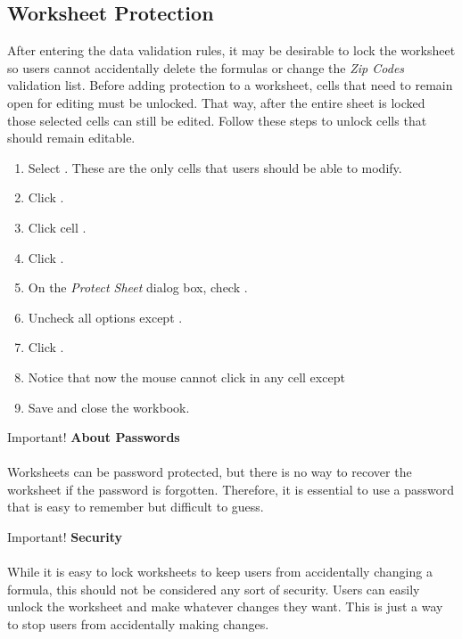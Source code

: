 \subsection{Worksheet Protection}

After entering the data validation rules, it may be desirable to lock the  worksheet so users cannot accidentally delete the formulas or change the \textit{Zip Codes} validation list. Before adding protection to a worksheet, cells that need to remain open for editing must be unlocked. That way, after the entire sheet is locked those selected cells can still be edited. Follow these steps to unlock cells that should remain editable. 

\begin{enumerate}
	\item Select . These are the only cells that users should be able to modify.
	\item Click .
	\item Click cell .
	\item Click .
	\item On the \textit{Protect Sheet} dialog box, check .
	\item Uncheck all options except .
	\item Click .
	\item Notice that now the mouse cannot click in any cell except 
	\item Save and close the  workbook.
\end{enumerate}

\begin{center}
	\begin{infobox}{Important!}
		\textbf{About Passwords}
		\\
		\\
		Worksheets can be password protected, but there is no way to recover the worksheet if the password is forgotten. Therefore, it is essential to use a password that is easy to remember but difficult to guess.
	\end{infobox}
\end{center}

\begin{center}
	\begin{infobox}{Important!}
		\textbf{Security}
		\\
		\\
		While it is easy to lock worksheets to keep users from accidentally changing a formula, this should not be considered any sort of security. Users can easily unlock the worksheet and make whatever changes they want. This is just a way to stop users from accidentally making changes.
	\end{infobox}
\end{center}

